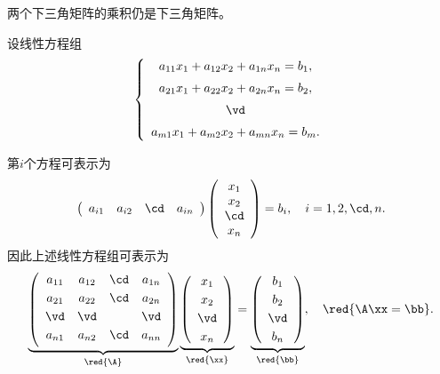 \begin{zhu*}
  两个下三角矩阵的乘积仍是下三角矩阵。
\end{zhu*}

设线性方程组
$$
\left\{
  \begin{array}{c}
    a_{11}x_1 + a_{12}x_2 + a_{1n}x_n = b_1, \\[0.2cm]
    a_{21}x_1 + a_{22}x_2 + a_{2n}x_n = b_2, \\[0.2cm]
    \vd \\[0.2cm]
    a_{m1}x_1 + a_{m2}x_2 + a_{mn}x_n = b_m.
  \end{array}
\right.
$$

第$i$个方程可表示为
$$
\left(
  \begin{array}{cccc}
    a_{i1} & a_{i2} & \cd &  a_{in}
  \end{array}
\right)
\left(
  \begin{array}{c}
    x_{1} \\
    x_{2} \\
    \cd   \\
    x_{n}
  \end{array}
\right) = b_i, \quad i=1,2,\cd,n.
$$ 
因此上述线性方程组可表示为
$$
\underbrace{
  \left(
    \begin{array}{cccc}
      a_{11} & a_{12} & \cd &  a_{1n} \\[0.1cm]
      a_{21} & a_{22} & \cd &  a_{2n} \\[0.1cm]
      \vd   & \vd   &     & \vd \\[0.1cm]
      a_{n1} & a_{n2} & \cd &  a_{nn} \\[0.1cm]
    \end{array}
  \right)
}_{\red{\A}}
\underbrace{
  \left(
    \begin{array}{c}
      x_{1} \\[0.1cm]
      x_{2} \\[0.1cm]
      \vd  \\[0.1cm]
      x_{n}
    \end{array}
  \right)
}_{\red{\xx}}
=     
\underbrace{
  \left(
    \begin{array}{c}
      b_{1} \\[0.1cm]
      b_{2} \\[0.1cm]
      \vd  \\[0.1cm]
      b_{n}
    \end{array}
  \right)
}_{\red{\bb}},  
\quad \red{\A\xx=\bb}.
$$
% 
% 




